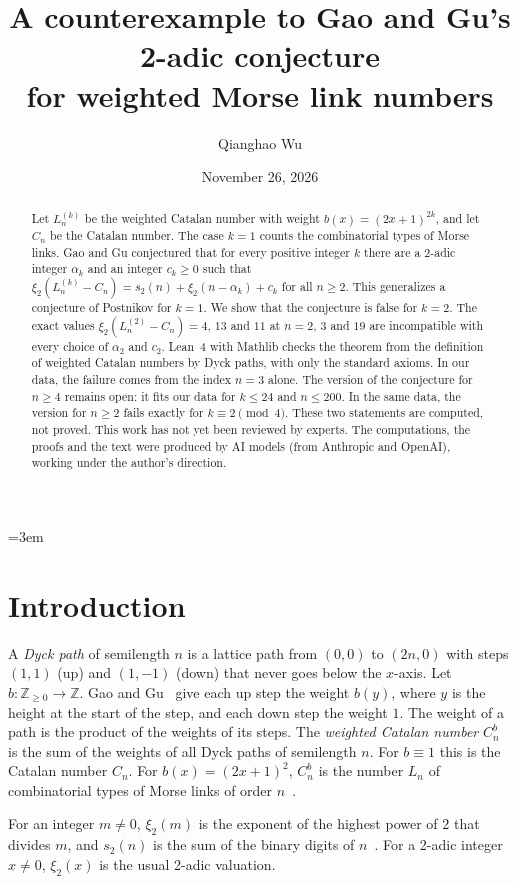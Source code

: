 \documentclass[11pt]{article}
\title{A counterexample to Gao and Gu's 2-adic conjecture\\ for weighted Morse link numbers}
\author{Qianghao Wu}
\date{November 26, 2026}
\theoremstyle{remark}
\newcommand{\Z}{\mathbb{Z}}
\begin{document}
\emergencystretch=3em
\maketitle

\begin{abstract}
Let $L^{(k)}_n$ be the weighted Catalan number with weight $b(x)=(2x+1)^{2k}$, and let $C_n$ be the Catalan number. The case $k=1$ counts the combinatorial types of Morse links. Gao and Gu conjectured that for every positive integer $k$ there are a 2-adic integer $\alpha_k$ and an integer $c_k\ge 0$ such that $\xi_2(L^{(k)}_n-C_n)=s_2(n)+\xi_2(n-\alpha_k)+c_k$ for all $n\ge 2$. This generalizes a conjecture of Postnikov for $k=1$. We show that the conjecture is false for $k=2$. The exact values $\xi_2(L^{(2)}_n-C_n)=4$, $13$ and $11$ at $n=2$, $3$ and $19$ are incompatible with every choice of $\alpha_2$ and $c_2$. Lean~4 with Mathlib checks the theorem from the definition of weighted Catalan numbers by Dyck paths, with only the standard axioms. In our data, the failure comes from the index $n=3$ alone. The version of the conjecture for $n\ge 4$ remains open: it fits our data for $k\le 24$ and $n\le 200$. In the same data, the version for $n\ge 2$ fails exactly for $k\equiv 2 \pmod 4$. These two statements are computed, not proved. This work has not yet been reviewed by experts. The computations, the proofs and the text were produced by AI models (from Anthropic and OpenAI), working under the author's direction.
\end{abstract}

\section{Introduction}

A \emph{Dyck path} of semilength $n$ is a lattice path from $(0,0)$ to $(2n,0)$ with steps $(1,1)$ (up) and $(1,-1)$ (down) that never goes below the $x$-axis. Let $b:\Z_{\ge0}\to\Z$. Gao and Gu~\cite[Definition~1.1]{GG} give each up step the weight $b(y)$, where $y$ is the height at the start of the step, and each down step the weight $1$. The weight of a path is the product of the weights of its steps. The \emph{weighted Catalan number} $C^b_n$ is the sum of the weights of all Dyck paths of semilength $n$. For $b\equiv 1$ this is the Catalan number $C_n$. For $b(x)=(2x+1)^2$, $C^b_n$ is the number $L_n$ of combinatorial types of Morse links of order $n$~\cite{Pos,GG}.

For an integer $m\ne 0$, $\xi_2(m)$ is the exponent of the highest power of $2$ that divides $m$, and $s_2(n)$ is the sum of the binary digits of $n$~\cite[p.~2]{GG}. For a 2-adic integer $x\ne 0$, $\xi_2(x)$ is the usual 2-adic valuation.
\end{document}
